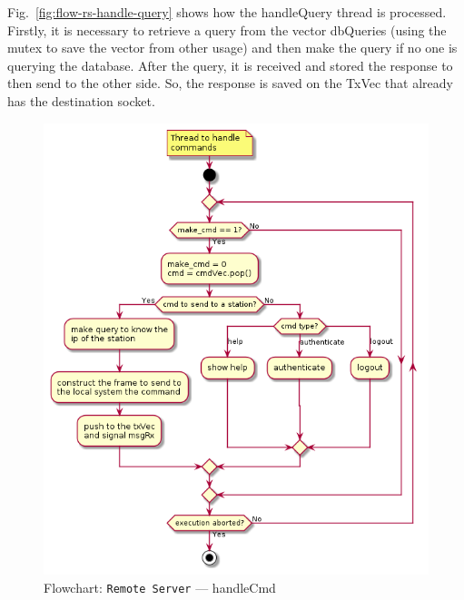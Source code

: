 Fig.~\ref{fig:flow-rs-handle-query} shows how the handleQuery thread is processed.
Firstly, it is necessary to retrieve a query from the vector dbQueries (using the mutex to save the vector from other usage) and then make the query if no one is querying the database.
After the query, it is received and stored the response to then send to the other side. So, the response is saved on the TxVec that already has the destination socket.
%
\begin{figure}[htb!]
\centering
    \includegraphics[width=0.4\columnwidth]{./img/flow-rs-handleCmd.png}
  \caption{Flowchart: \texttt{Remote Server} --- handleCmd}%
\label{fig:flow-rs-handle-cmd}
\end{figure}


